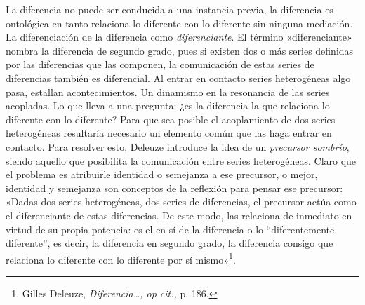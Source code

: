La diferencia no puede ser conducida a una instancia previa, la diferencia es ontológica en tanto relaciona lo diferente con lo diferente sin ninguna mediación. La diferenciación de la diferencia como \emph{diferenciante}. El término «diferenciante» nombra la diferencia de segundo grado, pues si existen dos o más series definidas por las diferencias que las componen, la comunicación de estas series de diferencias también es diferencial. Al entrar en contacto series heterogéneas algo pasa, estallan acontecimientos. Un dinamismo en la resonancia de las series acopladas. Lo que lleva a una pregunta: ¿es la diferencia la que relaciona lo diferente con lo diferente? Para que sea posible el acoplamiento de dos series heterogéneas resultaría necesario un elemento común que las haga entrar en contacto. Para resolver esto, Deleuze introduce la idea de un \emph{precursor sombrío}, siendo aquello que posibilita la comunicación entre series heterogéneas. Claro que el problema es atribuirle identidad o semejanza a ese precursor, o mejor, identidad y semejanza son conceptos de la reflexión para pensar ese precursor: «Dadas dos series heterogéneas, dos series de diferencias, el precursor actúa como el diferenciante de estas diferencias. De este modo, las relaciona de inmediato en virtud de su propia potencia: es el en-sí de la diferencia o lo ``diferentemente diferente'', es decir, la diferencia en segundo grado, la diferencia consigo que relaciona lo diferente con lo diferente por sí mismo»\footnote{Gilles Deleuze, \emph{Diferencia\ldots, op cit.,} p. 186.}.

